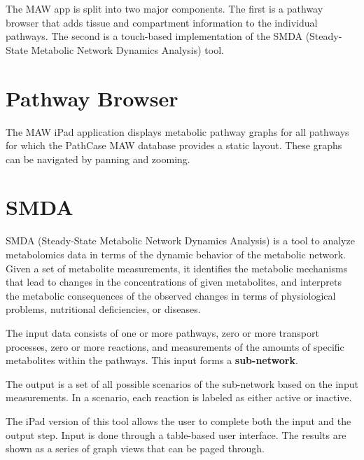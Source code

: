 The MAW app is split into two major components. The first is a pathway browser
that adds tissue and compartment information to the individual pathways. The
second is a touch-based implementation of the SMDA (Steady-State Metabolic
Network Dynamics Analysis) tool.

\section{Pathway Browser}

The MAW iPad application displays metabolic pathway graphs for all pathways for
which the PathCase MAW database provides a static layout. These graphs can be
navigated by panning and zooming.





\section{SMDA}
\label{sect:smda}

SMDA (Steady-State Metabolic Network Dynamics Analysis) is a tool to analyze
metabolomics data in terms of the dynamic behavior of the metabolic network.
Given a set of metabolite measurements, it identifies the metabolic mechanisms
that lead to changes in the concentrations of given metabolites, and interprets
the metabolic consequences of the observed changes in terms of physiological
problems, nutritional deficiencies, or diseases.

The input data consists of one or more pathways, zero or more transport
processes, zero or more reactions, and measurements of the amounts of specific
metabolites within the pathways. This input forms a \textbf{sub-network}.

The output is a set of all possible scenarios of the sub-network based on the
input measurements. In a scenario, each reaction is labeled as either active or
inactive.

The iPad version of this tool allows the user to complete both the input and
the output step. Input is done through a table-based user interface. The results
are shown as a series of graph views that can be paged through.








